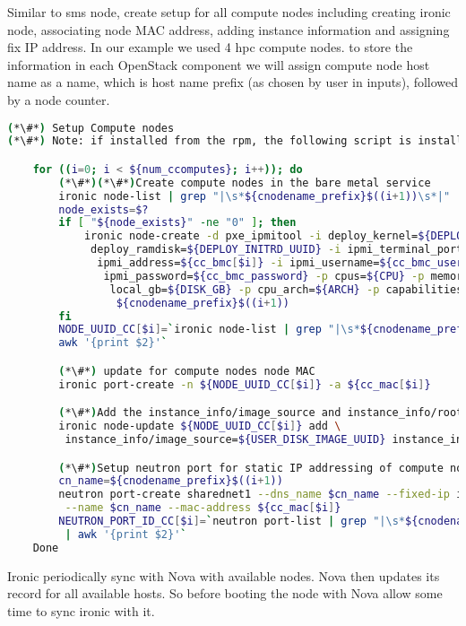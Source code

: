 Similar to sms node, create setup for all compute nodes including creating ironic node, associating node MAC address, adding instance information and assigning fix IP address. In our example we used 4 hpc compute nodes. to store the information in each OpenStack component we will assign compute node host name as a name, which is host name prefix (as chosen by user in inputs), followed by a node counter. 

\begin{lstlisting}[language=bash,keywords={}]
(*\#*) Setup Compute nodes
(*\#*) Note: if installed from the rpm, the following script is installed as setup_compute_nodes.sh 

    for ((i=0; i < ${num_ccomputes}; i++)); do
        (*\#*)(*\#*)Create compute nodes in the bare metal service
        ironic node-list | grep "|\s*${cnodename_prefix}$((i+1))\s*|"
        node_exists=$?
        if [ "${node_exists}" -ne "0" ]; then
            ironic node-create -d pxe_ipmitool -i deploy_kernel=${DEPLOY_VMLINUZ_UUID} -i \
             deploy_ramdisk=${DEPLOY_INITRD_UUID} -i ipmi_terminal_port=8023 -i \
              ipmi_address=${cc_bmc[$i]} -i ipmi_username=${cc_bmc_username} -i \
               ipmi_password=${cc_bmc_password} -p cpus=${CPU} -p memory_mb=${RAM_MB} -p \
                local_gb=${DISK_GB} -p cpu_arch=${ARCH} -p capabilities="boot_mode:bios" -n \
                 ${cnodename_prefix}$((i+1))
        fi
        NODE_UUID_CC[$i]=`ironic node-list | grep "|\s*${cnodename_prefix}$((i+1))\s*|" | \
        awk '{print $2}'`

        (*\#*) update for compute nodes node MAC
        ironic port-create -n ${NODE_UUID_CC[$i]} -a ${cc_mac[$i]}

        (*\#*)Add the instance_info/image_source and instance_info/root_gb
        ironic node-update ${NODE_UUID_CC[$i]} add \
         instance_info/image_source=${USER_DISK_IMAGE_UUID} instance_info/root_gb=50

        (*\#*)Setup neutron port for static IP addressing of compute nodes
        cn_name=${cnodename_prefix}$((i+1))
        neutron port-create sharednet1 --dns_name $cn_name --fixed-ip ip_address=${cc_ip[$i]} \
         --name $cn_name --mac-address ${cc_mac[$i]}
        NEUTRON_PORT_ID_CC[$i]=`neutron port-list | grep "|\s*${cnodename_prefix}$((i+1))\s*|" \
         | awk '{print $2}'`
    Done
\end{lstlisting}


 Ironic periodically sync with Nova with available nodes. Nova then updates its record for all available hosts. So before booting the node with Nova allow some time to sync ironic with it. 


